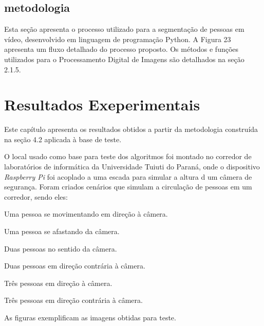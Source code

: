 \documentclass[12pt,oneside,a4paper,chapter=TITLE,section=TITLE,sumario=tradicional]{abntex2}
\begin{document}
\section{metodologia}
Esta seção apresenta o processo utilizado para a segmentação de pessoas em vídeo, desenvolvido em linguagem de programação Python. A Figura 23 apresenta um fluxo detalhado do processo proposto. Os métodos e funções utilizados para o Processamento Digital de Imagens são detalhados na seção 2.1.5.

\begin{figure}[htb]
\end{figure}
\chapter{Resultados Exeperimentais}
\label{cap:resultados}

Este capítulo apresenta os resultados obtidos a partir da metodologia construída na seção 4.2 aplicada à base de teste.

O local usado como base para teste dos algoritmos foi montado no corredor de laboratórios de informática da Universidade Tuiuti do Paraná, onde o dispositivo \textit{Raspberry Pi} foi acoplado a uma escada para simular a altura d um câmera de segurança.
Foram criados cenários que simulam a circulação de pessoas em um corredor, sendo eles:

\begin{lista}
    \item Uma pessoa se movimentando em direção à câmera.
    \item Uma pessoa se afastando da câmera.
    \item Duas pessoas no sentido da câmera.
    \item Duas pessoas em direção contrária à câmera.
    \item Três pessoas em direção à câmera.
    \item Três pessoas em direção contrária à câmera.
\end{lista}

As figuras exemplificam as imagens obtidas para teste.

\end{document}
